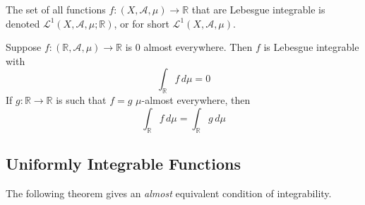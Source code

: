   \begin{definition}
    The set of all functions $f: (X, \mathcal{A}, \mu) \longrightarrow \mathbb{R}$ that are Lebesgue integrable is denoted $\mathcal{L}^1(X, \mathcal{A}, \mu; \mathbb{R})$, or for short $\mathcal{L}^1(X, \mathcal{A}, \mu)$. 
  \end{definition}

  \begin{theorem}
    Suppose $f: (\mathbb{R}, \mathcal{A}, \mu) \longrightarrow \mathbb{R}$ is $0$ almost everywhere. Then $f$ is Lebesgue integrable with 
    \begin{equation}
      \int_\mathbb{R} f \, d\mu = 0 
    \end{equation}
    If $g: \mathbb{R} \longrightarrow \mathbb{R}$ is such that $f = g$ $\mu$-almost everywhere, then
    \begin{equation}
      \int_\mathbb{R} f\, d\mu = \int_\mathbb{R} g \, d\mu
    \end{equation}
  \end{theorem}

\subsection{Uniformly Integrable Functions} 

  The following theorem gives an \textit{almost} equivalent condition of integrability. 

